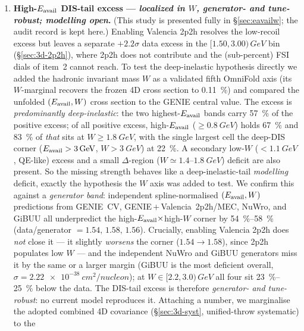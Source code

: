 \begin{enumerate}
  \item \textbf{High-$E_{\mathrm{avail}}$ DIS-tail excess --- \emph{localized in $W$,
        generator- and tune-robust; modelling open}.} (This study is presented
        fully in \S\ref{sec:eavailw}; the audit record is kept here.)
        Enabling Valencia 2p2h resolves the
        low-recoil excess but leaves a separate $+2.2\sigma$ data excess in the
        $[1.50,3.00)\,\si{GeV}$ bin (\S\ref{sec:3d-2p2h}), where 2p2h does not
        contribute and the (sub-percent) FSI dials of item~2 cannot reach. To test
        the deep-inelastic hypothesis directly we added the hadronic invariant mass
        $W$ as a validated fifth OmniFold axis (its $W$-marginal recovers the frozen
        4D cross section to \SI{0.11}{\percent}) and compared the unfolded
        $(E_{\mathrm{avail}},W)$ cross section to the GENIE central value. The excess is
        \emph{predominantly deep-inelastic}: the two highest-$E_{\mathrm{avail}}$ bands carry
        \SI{57}{\percent} of the positive excess; of all positive excess,
        high-$E_{\mathrm{avail}}$ ($\ge\SI{0.8}{GeV}$) holds \SI{67}{\percent} and
        \SI{83}{\percent} of \emph{that} sits at $W\ge\SI{1.8}{GeV}$, with the single
        largest cell the deep-DIS corner ($E_{\mathrm{avail}}>\SI{3}{GeV}$, $W>\SI{3}{GeV}$) at
        \SI{22}{\percent}. A secondary low-$W$ ($<\SI{1.1}{GeV}$, QE-like) excess and
        a small $\Delta$-region ($W\simeq1.4$--$\SI{1.8}{GeV}$) deficit are also
        present. So the missing strength behaves like a deep-inelastic-tail
        \emph{modelling} deficit, exactly the hypothesis the $W$ axis was added to
        test. We confirm this against a \emph{generator band}: independent
        spline-normalised $(E_{\mathrm{avail}},W)$ predictions from GENIE~CV,
        GENIE\,$+$\,Valencia~2p2h/MEC, NuWro, and GiBUU all underpredict the
        high-$E_{\mathrm{avail}}\times$high-$W$ corner by \SIrange{54}{58}{\percent}
        (data/generator $=1.54,\,1.58,\,1.56$). Crucially, enabling Valencia 2p2h
        does \emph{not} close it --- it slightly \emph{worsens} the corner
        ($1.54\to1.58$), since 2p2h populates low $W$ --- and the independent NuWro
        and GiBUU generators miss it by the same or a larger margin (GiBUU is the
        most deficient overall, $\sigma=\SI{2.22e-38}{cm^2/nucleon}$); at
        $W\in[2.2,3.0)\,\si{GeV}$ all four sit \SIrange{23}{25}{\percent} below the
        data. The DIS-tail excess is therefore \emph{generator- and tune-robust}: no
        current model reproduces it. Attaching a number, we marginalise the adopted
        combined 4D covariance (\S\ref{sec:3d-syst}, unified-throw systematic) to the

\end{enumerate}
